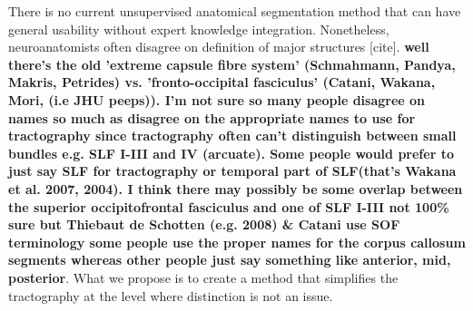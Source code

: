 \documentclass{bioinfo}
\begin{document}

There is no current unsupervised anatomical segmentation method that can
have general usability without expert knowledge
integration. Nonetheless, neuroanatomists often disagree on definition
of major structures [cite]. \textbf{well there's the old 'extreme
  capsule fibre system' (Schmahmann, Pandya, Makris, Petrides)
  vs. 'fronto-occipital fasciculus' (Catani, Wakana, Mori, (i.e JHU
  peeps)). I'm not sure so many people disagree on names so much as
  disagree on the appropriate names to use for tractography since
  tractography often can't distinguish between small bundles e.g. SLF
  I-III and IV (arcuate). Some people would prefer to just say SLF for
  tractography or temporal part of SLF(that's Wakana et al. 2007,
  2004). I think there may possibly be some overlap between the superior
  occipitofrontal fasciculus and one of SLF I-III not 100\% sure but
  Thiebaut de Schotten (e.g. 2008) \& Catani use SOF terminology some
  people use the proper names for the corpus callosum segments whereas
  other people just say something like anterior, mid, posterior}. What
we propose is to create a method that simplifies the tractography at the
level where distinction is not an issue.
\end{document}
